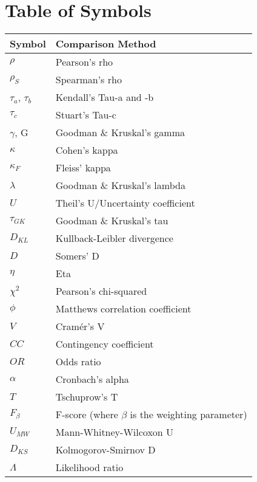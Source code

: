\documentclass[11pt]{article}
\begin{document}
\section{Table of Symbols}
\begin{table}[h]
\centering
\begin{tabular}{|l|l|}
\hline
\textbf{Symbol} & \textbf{Comparison Method} \\ \hline
$\rho$              & Pearson's rho \\ \hline
$\rho_S$            & Spearman's rho \\ \hline
$\tau_a$, $\tau_b$  & Kendall's Tau-a and -b \\ \hline
$\tau_c$            & Stuart's Tau-c \\ \hline
$\gamma$, G         & Goodman \& Kruskal's gamma\\ \hline
$\kappa$            & Cohen's kappa \\ \hline
$\kappa_F$          & Fleiss' kappa \\ \hline
$\lambda$           & Goodman \& Kruskal's lambda\\ \hline
$U$                 & Theil's U/Uncertainty coefficient\\ \hline
$\tau_{GK}$         & Goodman \& Kruskal's tau\\ \hline
$D_{KL}$            & Kullback-Leibler divergence\\ \hline
$D$                 & Somers' D\\ \hline
$\eta$              & Eta \\ \hline
$\chi^2$            & Pearson's chi-squared\\ \hline
$\phi$              & Matthews correlation coefficient\\ \hline
$V$                 & Cram\'er's V\\ \hline
$CC$                & Contingency coefficient \\ \hline
$OR$                & Odds ratio\\ \hline
$\alpha$            & Cronbach's alpha\\ \hline
$T$                 & Tschuprow's T\\ \hline
$F_\beta$           & F-score (where $\beta$ is the weighting parameter)\\ \hline
$U_{MW}$            & Mann-Whitney-Wilcoxon U\\ \hline
$D_{KS}$            & Kolmogorov-Smirnov D\\ \hline
$\Lambda$           & Likelihood ratio\\ \hline

\end{tabular}
\end{table}
\end{document}
